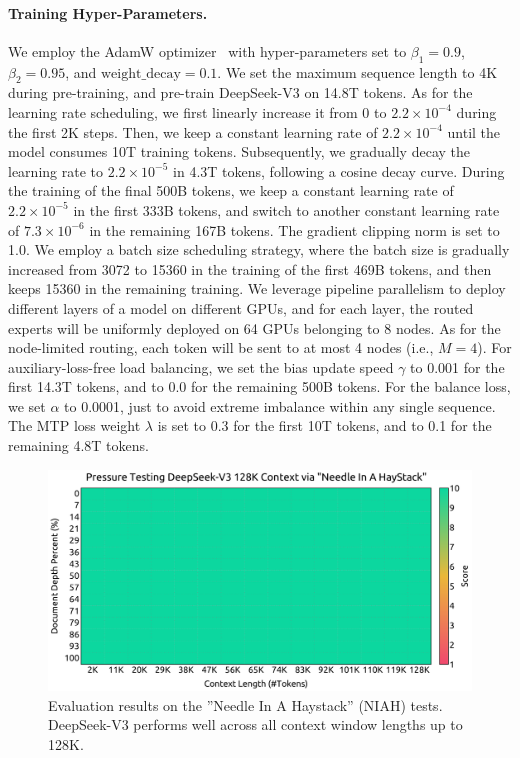 \documentclass[11pt, a4paper, logo, copyright, nonumbering]{deepseek}
\newcommand{\dsviii}{DeepSeek-V3}
\begin{document}
\begin{CJK*}{UTF8}{gbsn}
\paragraph{Training Hyper-Parameters.}
We employ the AdamW optimizer~\citep{adamW} with hyper-parameters set to $\beta_1=0.9$, $\beta_2=0.95$, and $\mathrm{weight\_decay}=0.1$. 
We set the maximum sequence length to 4K during pre-training, and pre-train \dsviii{} on 14.8T tokens. 
As for the learning rate scheduling, we first linearly increase it from 0 to $2.2 \times 10^{-4}$ during the first 2K steps. 
Then, we keep a constant learning rate of $2.2 \times 10^{-4}$ until the model consumes 10T training tokens. 
Subsequently, we gradually decay the learning rate to $2.2 \times 10^{-5}$ in 4.3T tokens, following a cosine decay curve. 
During the training of the final 500B tokens, we keep a constant learning rate of $2.2 \times 10^{-5}$ in the first 333B tokens, and switch to another constant learning rate of $7.3 \times 10^{-6}$ in the remaining 167B tokens. 
The gradient clipping norm is set to 1.0.
We employ a batch size scheduling strategy, where the batch size is gradually increased from 3072 to 15360 in the training of the first 469B tokens, and then keeps 15360 in the remaining training. 
We leverage pipeline parallelism to deploy different layers of a model on different GPUs, and for each layer, the routed experts will be uniformly deployed on 64 GPUs belonging to 8 nodes. 
As for the node-limited routing, each token will be sent to at most 4 nodes (i.e., $M=4$). 
For auxiliary-loss-free load balancing, we set the bias update speed $\gamma$ to 0.001 for the first 14.3T tokens, and to 0.0 for the remaining 500B tokens. 
For the balance loss, we set $\alpha$ to 0.0001, just to avoid extreme imbalance within any single sequence. 
The MTP loss weight $\lambda$ is set to 0.3 for the first 10T tokens, and to 0.1 for the remaining 4.8T tokens. 

\begin{figure}[h]
\centering
\includegraphics[width=0.98\linewidth]{figures/needle_in_a_haystack.pdf}
\caption{
Evaluation results on the ''Needle In A Haystack'' (NIAH) tests. 
\dsviii{} performs well across all context window lengths up to 128K. 
}
\label{fig:long_context}
\end{figure}


\end{CJK*}
\end{document}
